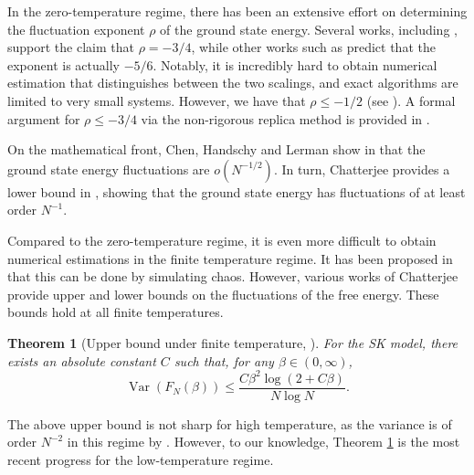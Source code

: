 \documentclass[11pt]{article}
\numberwithin{equation}{section}
\DeclareMathOperator{\Var}{Var}
\def \b {\beta}
\def \r {\rho}
\newtheorem{theorem}{Theorem}[section]
\theoremstyle{remark}
\begin{document}
In the zero-temperature regime, there has been an extensive effort on determining the fluctuation exponent $\r$ of the ground state energy. Several works, including \cites{bouchaud2003energy, Boettcher_2005}, support the claim that $\r = -3/4$, while other works such as \cites{crisanti1992replica, conjSK1, ParisiRizzo09} predict that the exponent is actually $-5/6$. Notably, it is incredibly hard to obtain numerical estimation that distinguishes between the two scalings, and exact algorithms are limited to very small systems. However, we have that $\r \leq -1/2$ (see \cite[Section 2.2]{Chatterjee19}). A formal argument for $\r \leq -3/4$ via the non-rigorous replica method is provided in \cite{conjSK2}. 

On the mathematical front, Chen, Handschy and Lerman show in \cite{ChenHandschyLerman2018} that the ground state energy fluctuations are $o(N^{-1/2})$. In turn, Chatterjee provides a lower bound in \cite{Chatterjee19}, showing that the ground state energy has fluctuations of at least order $N^{-1}$.

Compared to the zero-temperature regime, it is even more difficult to obtain numerical estimations in the finite temperature regime. It has been proposed in \cite{conjSK2} that this can be done by simulating chaos. However, various works \cites{Chatterjee09, Chatterjee2014book, Chatterjee19} of Chatterjee provide upper and lower bounds on the fluctuations of the free energy. These bounds hold at all finite temperatures. 

\begin{theorem}[Upper bound under finite temperature, ]\label{thm:chatterjee_upperbd}
For the SK model, there exists an absolute constant $C$ such that, for any $\b \in (0,\infty)$, 
\[
\Var(F_N(\b)) \leq \frac{C\b^2\log(2+C\b)}{N \log N}.
\]
\end{theorem}
The above upper bound is not sharp for high temperature, as the variance is of order $N^{-2}$ in this regime by \cite{AizenmanLebowitzRuelle}. However, to our knowledge, Theorem \ref{thm:chatterjee_upperbd} is the most recent progress for the low-temperature regime.
\end{document}
